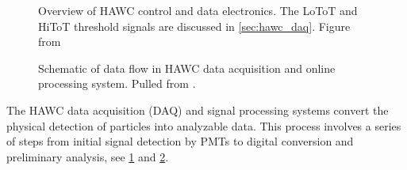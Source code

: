 \begin{figure}
    \caption{Overview of HAWC control and data electronics. The LoToT and HiToT threshold signals are discussed in \cref{sec:hawc_daq}. Figure from \cite{nim:hawc_detect}}
    \label{fig:basic_tanks_schem}
\end{figure}

\begin{figure}
    \caption{Schematic of data flow in HAWC data acquisition and online processing system. Pulled from \cite{HAWC_DAQ_NIM}.}
    \label{fig:dig_schem}
\end{figure}

The HAWC data acquisition (DAQ) and signal processing systems convert the physical detection of particles into analyzable data.
This process involves a series of steps from initial signal detection by PMTs to digital conversion and preliminary analysis, see \cref{fig:basic_tanks_schem} and \cref{fig:dig_schem}.

